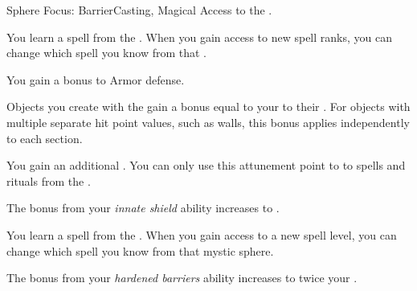     \begin{feat}{Sphere Focus: Barrier}{Casting, Magical}
        \featpre Access to the  .

         You learn a spell from the  .
        When you gain access to new spell ranks, you can change which spell you know from that .

         You gain a  bonus to Armor defense.

         Objects you create with the   gain a bonus equal to your  to their .
        For objects with multiple separate hit point values, such as walls, this bonus applies independently to each section.

         You gain an additional .
        You can only use this attunement point to  to spells and rituals from the  .

         The bonus from your \textit{innate shield} ability increases to .

         You learn a spell from the  .
        When you gain access to a new spell level, you can change which spell you know from that mystic sphere.

         The bonus from your \textit{hardened barriers} ability increases to twice your .
    \end{feat}


